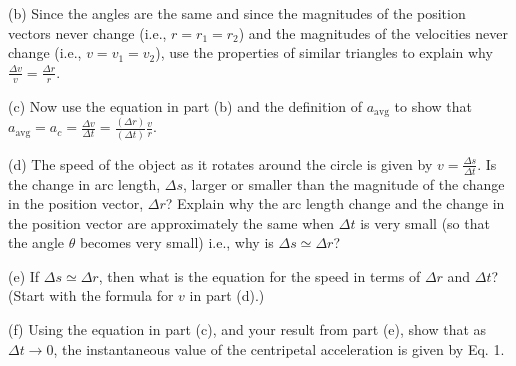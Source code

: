 (b) Since the angles are the same and since the magnitudes of the position vectors 
never change (i.e., $r= r_{1}  = r_{2} $) and the magnitudes of the
velocities never change (i.e., $v = v_{1} = v_{2} $), use the properties
of similar triangles to explain why \( \frac{\Delta v}{v}=\frac{\Delta r}{r} \).
\vspace{20mm}

(c) Now use the equation in part (b) and the definition of $ { a}_{\mathrm{avg}}$ to show that
\(  {a}_{\mathrm{avg}}={a}_{c} =\frac{\Delta v}{\Delta t}=\frac{\left( \Delta r\right) }{\left( \Delta t\right) }\frac{v}{r}. \)
\vspace{20mm}

(d) The speed of the object as it rotates around the circle is 
given by \( v=\frac{\Delta s}{\Delta t} \).
Is the change in arc length, \( \Delta  s\), larger or smaller than the magnitude
of the change in the position vector, \( \Delta  r\)? Explain why the arc length
change and the change in the position vector are approximately the same when
$\Delta t$ is very small (so that the angle $\theta$ 
becomes very small) i.e., why is \( \Delta  s
\simeq  \Delta  r\)?
\vspace{20mm}

(e) If \( \Delta  s  \simeq   \Delta  r\), then what is the equation
for the speed in terms of \( \Delta  r\) and \( \Delta  t\)?  (Start with the formula for $v$ 
in part (d).)
\vspace{20mm}

(f) Using the equation in part (c), and your result from part (e), 
show that as \( \Delta  t\rightarrow 0 \), 
the instantaneous value of the centripetal acceleration is given by Eq. 1.

